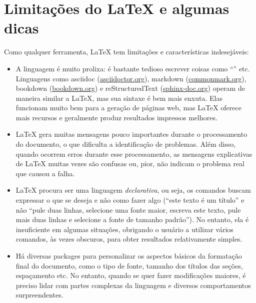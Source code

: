 \section{Limitações do \LaTeX{} e algumas dicas}
\label{sec:limitations}

Como qualquer ferramenta, \LaTeX{} tem limitações e características
indesejáveis:

\begin{itemize}
    \item A linguagem é muito prolixa: é bastante tedioso escrever
    coisas como ``'' etc.
    Linguagens como asciidoc (\url{asciidoctor.org}), markdown
    (\url{commonmark.org}), bookdown (\url{bookdown.org}) e
    reStructuredText (\url{sphinx-doc.org}) operam de maneira similar
    a \LaTeX{}, mas sua sintaxe é bem mais enxuta. Elas funcionam
    muito bem para a geração de páginas web, mas \LaTeX{} oferece
    mais recursos e geralmente produz resultados impressos melhores.

    \item \LaTeX{} gera muitas mensagens pouco importantes durante
    o processamento do documento, o que dificulta a identificação
    de problemas. Além disso, quando ocorrem erros durante esse
    processamento, as mensagens explicativas de \LaTeX{} muitas vezes
    são confusas ou, pior, não indicam o problema real que causou a falha.

    \item \LaTeX{} procura ser uma linguagem \emph{declarativa}, ou seja,
    os comandos buscam expressar o que se deseja e não como fazer algo
    (``este texto é um título'' e não ``pule duas linhas, selecione uma
    fonte maior, escreva este texto, pule mais duas linhas e selecione a
    fonte de tamanho padrão''). No entanto, ela é insuficiente em algumas
    situações, obrigando o usuário a utilizar vários comandos, às vezes
    obscuros, para obter resultados relativamente simples.

    \item Há diversas packages para personalizar os aspectos básicos
    da formatação final do documento, como o tipo de fonte, tamanho dos
    títulos das seções, espaçamento etc. No entanto, quando se quer
    fazer modificações maiores, é preciso lidar com partes complexas da
    linguagem e diversos comportamentos surpreendentes.


\end{itemize}
